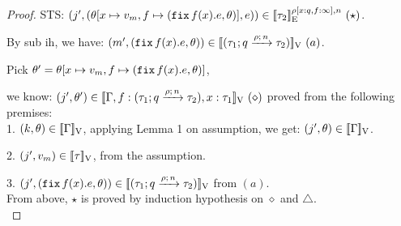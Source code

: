 \documentclass[a4paper,11pt]{article}
\theoremstyle{definition}
\begin{document}
\begin{proof}
	STS: $(j', (\env[x \mapsto \valr_m, f \mapsto (\efix f(x).\expr, \env)], \expr)) \in \lre{\dmap[x: \nnatbiA, f: \infty]}{\nnatA}{\type_2} ~ (\star)$.
	
	By sub ih, we have:
	$(m', (\efix f(x). \expr, \env)) \in \lrv{(\tarr{\type_1}{\type_2}{\nnatbiA}{\dmap}{\nnatA})} ~ (a)$.

	Pick $\env' = \env[x \mapsto \valr_m, f \mapsto (\efix f(x).\expr, \env)]$,
	
	we know: $(j', \env') \in \lrv{\Gamma,
          f:(\tarr{\type_1}{\type_2}{\nnatbiA}{\dmap}{\nnatA}),  x:
          \type_1} ~ (\diamond)$ proved from the following premises:\\ 
	
	1. $ (\stepiA, \env) \in \lrv{\Gamma}$, applying Lemma 1 on assumption, we get: $(j', \env) \in \lrv{\Gamma}$.
	
	2. $(j', \valr_m) \in \lrv{\type}$, from the assumption.
	
	3. $(j', (\efix f(x). \expr, \env)) \in \lrv{(\tarr{\type_1}{\type_2}{\nnatbiA}{\dmap}{\nnatA})}$ from $(a)$.\\
%
From above, $\star$ is proved by induction hypothesis on $\diamond$ and $\triangle$.\\
%



\end{proof}
\end{document}
